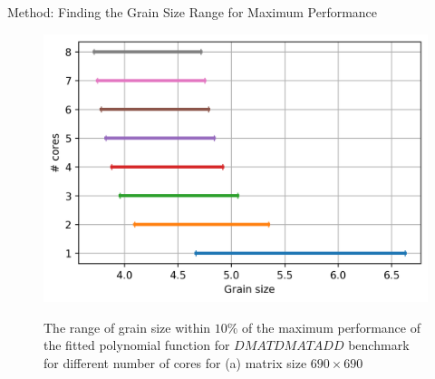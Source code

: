 \documentclass[10pt]{beamer}
\begin{document}
\begin{frame}{Method: Finding the Grain Size Range for Maximum Performance}
	\begin{outline}
		\begin{figure}[H]
			\centering
			{\includegraphics[scale=.3]{images/polyfit/fig_690_peak_range_all.png}\label{fig13:a}}
			\caption{The range of grain size within $10\%$ of the maximum performance of the fitted polynomial function for $DMATDMATADD$ benchmark for different number of cores for (a) matrix size $690\times690$}	
			\label{fig13}
\end{figure}
\end{outline}
\end{frame}
\end{document}
